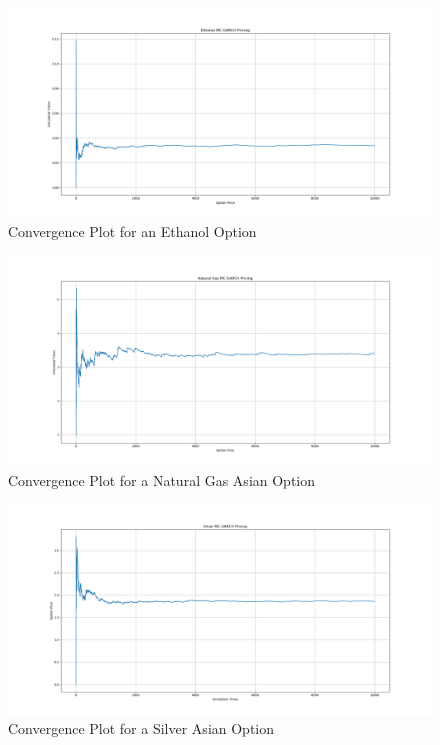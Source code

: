 \documentclass[10pt, a4paper, twocolumn]{article} %
\begin{document}
\begin{figure}[!ht]
	\includegraphics[width=\linewidth]{Ethanolmcconvergence1.png} %
	\caption{Convergence Plot for an Ethanol Option} %
	\label{eth conv} %
\end{figure}

\begin{figure}[!ht]
	\includegraphics[width=\linewidth]{Naturalgasmcconvergence1.png} %
	\caption{Convergence Plot for a Natural Gas Asian Option} %
	\label{gas conv} %
\end{figure}

\begin{figure}[!ht]
	\includegraphics[width=\linewidth]{Silvermcconvergence1.png} %
	\caption{Convergence Plot for a Silver Asian Option} %
	\label{silver conv} %
\end{figure}
\end{document}
